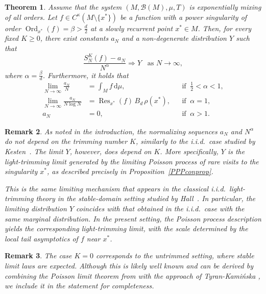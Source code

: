 \documentclass[11pt,twoside,a4paper,reqno]{amsart}
\newtheorem{theorem}{Theorem}
\newtheorem{remark}[theorem]{Remark}
\newcommand{\Res}{\operatorname{Res}}
\newcommand{\as}[1]{\text{as } #1 \rightarrow\infty}
\begin{document}
\begin{theorem}\label{lighttrimthm}
Assume that the system $(M, \mathcal{B}(M), \mu, T)$ is exponentially mixing of all orders. Let $f \in C^{\kappa}(M \setminus \{x^*\})$ be a function with a power singularity of order $\operatorname{Ord}_{x^*}(f)=\beta>\frac{d}{2}$ at a slowly recurrent point $x^*\in M$. Then, for every fixed $K\geq 0$, there exist constants $a_N$ and a non-degenerate distribution $Y$ such that
\begin{equation*}
\frac{S_N^K(f) - a_N}{N^{\alpha}} \Rightarrow Y \;\;\;\as{N},
\end{equation*}
where $\alpha=\frac{\beta}{d}$. Furthermore, it holds that
\begin{align*}
\lim_{N\to\infty} \frac{a_N}{N}
&= \int_M f\,\mathrm{d}\mu,
&& \text{if}\;\; \tfrac12<\alpha<1,\\[0.5ex]
\lim_{N\to\infty} \frac{a_N}{N\log N}
&= \Res_{x^*}(f)\, B_d\, \rho(x^*),
&& \text{if}\;\; \alpha=1,\\[0.5ex]
a_N
&= 0,
&& \text{if}\;\; \alpha>1.
\end{align*}
\end{theorem}


\begin{remark}
As noted in the introduction, the normalizing sequences $a_N$ and $N^\alpha$ do not depend on the trimming number $K$, similarly to the i.i.d.\ case studied by Kesten~\cite{kestenweak}. The limit $Y$, however, does depend on $K$. More specifically, $Y$ is the light-trimming limit generated by the limiting Poisson process of rare visits to the singularity $x^*$, as described precisely in Proposition~\ref{PPPconprop}.

This is the same limiting mechanism that appears in the classical i.i.d.\ light-trimming theory in the stable-domain setting studied by Hall~\cite{Hal78}. In particular, the limiting distribution $Y$ coincides with that obtained in the i.i.d.\ case with the same marginal distribution. In the present setting, the Poisson process description yields the corresponding light-trimming limit, with the scale determined by the local tail asymptotics of $f$ near $x^*$.
\end{remark}


\begin{remark}
The case $K=0$ corresponds to the untrimmed setting, where stable limit laws are expected. Although this is likely well known and can be derived by combining the Poisson limit theorem from \cite{DFL22} with the approach of Tyran-Kami\'{n}ska \cite{Tyr10}, we include it in the statement for completeness.
\end{remark}
\end{document}

